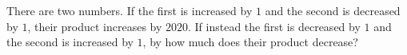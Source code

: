There are two numbers. If the first is increased by $1$ and the second is decreased by $1$, their product increases by $2020$. If instead the first is decreased by $1$ and the second is increased by $1$, by how much does their product decrease?
